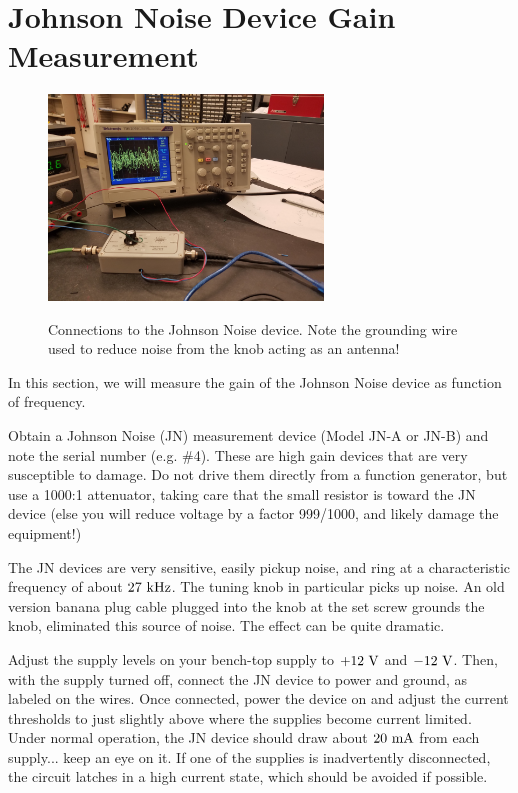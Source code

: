 \documentclass[12pt]{article}
\begin{document}
\section{Johnson Noise Device Gain Measurement}

\begin{figure}[htbp]
\begin{center}
{\includegraphics[width=0.65\textwidth]{figs/antenna_grounded.jpg}}
\end{center}
\caption{\label{fig:plan} Connections to the Johnson Noise device.  Note the grounding wire used to reduce noise from the knob acting as an antenna!}
\end{figure}

In this section, we will measure the gain of the Johnson Noise device as function of frequency.

Obtain a Johnson Noise (JN) measurement device (Model JN-A or JN-B) and note the serial number (e.g. \#4).  These are high gain devices that are very susceptible to damage.  Do not drive them directly from a function generator, but use a 1000:1 attenuator, taking care that the small resistor is toward the JN device (else you will reduce voltage by a factor 999/1000, and likely damage the equipment!)  

The JN devices are very sensitive, easily pickup noise, and ring at a characteristic frequency of about $27~{\rm kHz}$.  The tuning knob in particular picks up noise.  An old version banana plug cable plugged into the knob at the set screw grounds the knob, eliminated this source of noise.  The effect can be quite dramatic. 

Adjust the supply levels on your bench-top supply to $+12~{\rm V}$ and $-12~{\rm V}$.  Then, with the supply turned off, connect the JN device to power and ground, as labeled on the wires.  Once connected, power the device on and adjust the current thresholds to just slightly above where the supplies become current limited.  Under normal operation, the JN device should draw about $20~\rm mA$ from each supply... keep an eye on it.  If one of the supplies is inadvertently disconnected, the circuit latches in a high current state, which should be avoided if possible.
\end{document}
